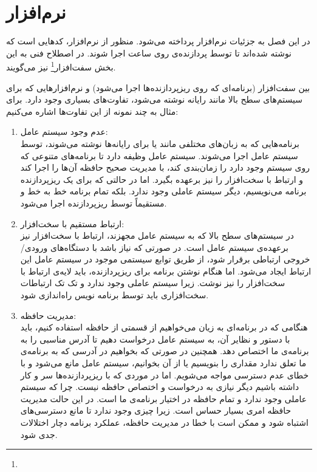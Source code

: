 \chapter{نرم‌افزار} \label{chap:firmware}

در این فصل به جزئیات نرم‌افزار پرداخته می‌شود. منظور از نرم‌افزار، کدهایی است که نوشته شده‌اند تا توسط پردازنده‌ی روی ساعت اجرا شوند. در اصطلاح فنی به این بخش سفت‌افزار\footnote{} نیز می‌گویند.

بین سفت‌افزار (برنامه‌ای که روی ریزپردازنده‌ها اجرا می‌شود) و نرم‌افزارهایی که برای سیستم‌های سطح بالا مانند رایانه نوشته می‌شود، تفاوت‌های بسیاری وجود دارد. برای مثال به چند نمونه از این تفاوت‌ها اشاره می‌کنیم:

\begin{enumerate}
	\item عدم وجود سیستم عامل: \\
	برنامه‌هایی که به زبان‌های مختلفی مانند  یا  برای رایانه‌ها نوشته می‌شوند، توسط سیستم عامل اجرا می‌شوند. سیستم عامل وظیفه دارد تا برنامه‌های متنوعی که روی سیستم وجود دارد را زمان‌بندی کند، با مدیریت صحیح حافظه آن‌ها را اجرا کند و ارتباط با سخت‌افزار را نیز برعهده بگیرد. اما در حالتی که برای یک ریزپردازنده برنامه می‌نویسیم، دیگر سیستم عاملی وجود ندارد. بلکه تمام برنامه خط به خط و مستقیماً توسط ریزپردازنده اجرا می‌شود.
	
	\item ارتباط مستقیم با سخت‌افزار: \\
	در سیستم‌های سطح بالا که به سیستم عامل مجهزند، ارتباط با سخت‌افزار نیز برعهده‌ی سیستم عامل است. در صورتی که نیاز باشد با دستگاه‌های ورودی/خروجی ارتباطی برقرار شود، از طریق توابع سیستمی موجود در سیستم عامل این ارتباط ایجاد می‌شود. اما هنگام نوشتن برنامه برای ریزپردازنده، باید لایه‌ی ارتباط با سخت‌افزار را نیز نوشت. زیرا سیستم عاملی وجود ندارد و تک تک ارتباطات سخت‌افزاری باید توسط برنامه نویس راه‌اندازی شود.
	
	\item مدیریت حافظه: \\
	هنگامی که در برنامه‌ای به زیان  می‌خواهیم از قسمتی از حافظه استفاده کنیم، باید با دستور  و نظایر آن، به سیستم عامل درخواست دهیم تا آدرس مناسبی را به برنامه‌ی ما اختصاص دهد. همچنین در صورتی که بخواهیم در آدرسی که به برنامه‌ی ما تعلق ندارد مقداری را بنویسیم یا از آن بخوانیم، سیستم عامل مانع می‌شود و با خطای عدم دسترسی مواجه می‌شویم. اما در موردی که با ریزپردازنده‌ها سر و کار داشته باشیم دیگر نیازی به درخواست و اختصاص حافظه نیست. چرا که سیستم عاملی وجود ندارد و تمام حافظه در اختیار برنامه‌ی ما است. در این حالت مدیریت حافظه امری بسیار حساس است. زیرا چیزی وجود ندارد تا مانع دسترسی‌های اشتباه شود و ممکن است با خطا در مدیریت حافظه، عملکرد برنامه دچار اختلالات جدی شود.
	

\end{enumerate}
